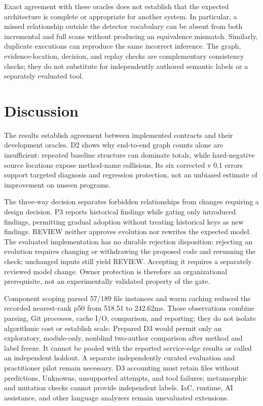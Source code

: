 \documentclass[conference]{IEEEtran}
\begin{document}
Exact agreement with these oracles does not establish that the expected architecture is complete or appropriate for another system. In particular, a missed relationship outside the detector vocabulary can be absent from both incremental and full scans without producing an equivalence mismatch. Similarly, duplicate executions can reproduce the same incorrect inference. The graph, evidence-location, decision, and replay checks are complementary consistency checks; they do not substitute for independently authored semantic labels or a separately evaluated tool.

\section{Discussion}
The results establish agreement between implemented contracts and their development oracles. D2 shows why end-to-end graph counts alone are insufficient: repeated baseline structure can dominate totals, while hard-negative source locations expose method-name collisions. Its six corrected v 0.1 errors support targeted diagnosis and regression protection, not an unbiased estimate of improvement on unseen programs.

The three-way decision separates forbidden relationships from changes requiring a design decision. P3 reports historical findings while gating only introduced findings, permitting gradual adoption without treating historical keys as new findings. REVIEW neither approves evolution nor rewrites the expected model. The evaluated implementation has no durable rejection disposition: rejecting an evolution requires changing or withdrawing the proposed code and rerunning the check; unchanged inputs still yield REVIEW. Accepting it requires a separately reviewed model change. Owner protection is therefore an organizational prerequisite, not an experimentally validated property of the gate.

Component scoping parsed 57/189 file instances and warm caching reduced the recorded nearest-rank p50 from 518.51 to 242.62ms. Those observations combine parsing, Git processes, cache I/O, comparison, and reporting; they do not isolate algorithmic cost or establish scale. Prepared D3 would permit only an exploratory, module-only, nonblind two-author comparison after method and label freeze. It cannot be pooled with the reported service-edge results or called an independent holdout. A separate independently curated evaluation and practitioner pilot remain necessary. D3 accounting must retain files without predictions, Unknowns, unsupported attempts, and tool failures; metamorphic and mutation checks cannot provide independent labels. IaC, runtime, AI assistance, and other language analyzers remain unevaluated extensions.
\end{document}
